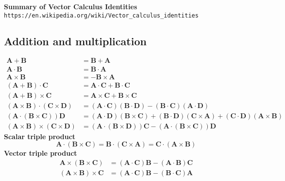 \documentclass[11pt]{article}
\begin{document}
\begin{center}
\Large{\bf Summary of Vector Calculus Identities}\\
\footnotesize{\texttt{https://en.wikipedia.org/wiki/Vector\_calculus\_identities}}
\end{center}
\begin{multicols}{2}
\subsection*{Addition and multiplication}
\begin{align*}
 \mathbf{A}+\mathbf{B}&=\mathbf{B}+\mathbf{A} \\
 \mathbf{A}\cdot\mathbf{B}&=\mathbf{B}\cdot\mathbf{A} \\
 \mathbf{A}\times\mathbf{B}&=\mathbf{-B}\times\mathbf{A}\\ 
 \left(\mathbf{A}+\mathbf{B}\right)\cdot\mathbf{C}&=\mathbf{A}\cdot\mathbf{C}+\mathbf{B}\cdot\mathbf{C} \\
 \left(\mathbf{A}+\mathbf{B}\right)\times\mathbf{C}&=\mathbf{A}\times\mathbf{C}+\mathbf{B}\times\mathbf{C}\\ 
 \left(\mathbf{A}\times\mathbf{B}\right)\cdot\left(\mathbf{C}\times\mathbf{D}\right)&=\left(\mathbf{A}\cdot\mathbf{C}\right)\left(\mathbf{B}\cdot\mathbf{D}\right)-\left(\mathbf{B}\cdot\mathbf{C}\right)\left(\mathbf{A}\cdot\mathbf{D}\right) \\
\left(\mathbf{A}\cdot\left(\mathbf{B}\times\mathbf{C}\right)\right)\mathbf{D}&=\left(\mathbf{A}\cdot\mathbf{D}\right)\left(\mathbf{B}\times\mathbf{C}\right)+\left(\mathbf{B}\cdot\mathbf{D}\right)\left(\mathbf{C}\times\mathbf{A}\right)+\left(\mathbf{C}\cdot\mathbf{D}\right)\left(\mathbf{A}\times\mathbf{B}\right) \\
\left(\mathbf{A}\times\mathbf{B}\right)\times\left(\mathbf{C}\times\mathbf{D}\right)
&=\left(\mathbf{A}\cdot\left(\mathbf{B}\times\mathbf{D}\right)\right)\mathbf{C}-\left(\mathbf{A}\cdot\left(\mathbf{B}\times\mathbf{C}\right)\right)\mathbf{D}
\end{align*}
\textbf{Scalar triple product}
\[\mathbf{A}\cdot\left(\mathbf{B}\times\mathbf{C}\right)=\mathbf{B}\cdot\left(\mathbf{C}\times\mathbf{A}\right)=\mathbf{C}\cdot\left(\mathbf{A}\times\mathbf{B}\right) \] %
\textbf{Vector triple product}
\begin{align*}
\mathbf{A}\times\left(\mathbf{B}\times\mathbf{C}\right)&=\left(\mathbf{A}\cdot\mathbf{C}\right)\mathbf{B}-\left(\mathbf{A}\cdot\mathbf{B}\right)\mathbf{C} \\ %
\left(\mathbf{A}\times\mathbf{B}\right)\times\mathbf{C}&=\left(\mathbf{A}\cdot\mathbf{C}\right)\mathbf{B}-\left(\mathbf{B}\cdot\mathbf{C}\right)\mathbf{A} %
\end{align*}


\end{multicols}
\end{document}
